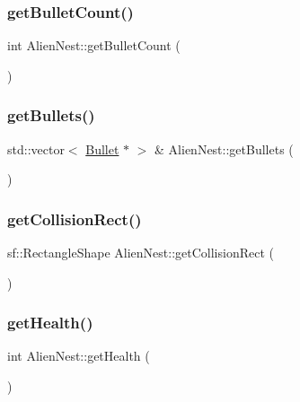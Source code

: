 \mbox{\label{class_alien_nest_a076132ab9da2dae0b0a4eb66b7dc41b8}} 
\subsubsection{\texorpdfstring{get\+Bullet\+Count()}{getBulletCount()}}
{\footnotesize\ttfamily int Alien\+Nest\+::get\+Bullet\+Count (\begin{DoxyParamCaption}{ }\end{DoxyParamCaption})}

\mbox{\label{class_alien_nest_a06b510eab5f7bb869078662f42080738}} 
\subsubsection{\texorpdfstring{get\+Bullets()}{getBullets()}}
{\footnotesize\ttfamily std\+::vector$<$ \hyperlink{class_bullet}{Bullet} $\ast$ $>$ \& Alien\+Nest\+::get\+Bullets (\begin{DoxyParamCaption}{ }\end{DoxyParamCaption})}

\mbox{\label{class_alien_nest_a7522ad4ae88e2471de29ab62451ec36a}} 
\subsubsection{\texorpdfstring{get\+Collision\+Rect()}{getCollisionRect()}}
{\footnotesize\ttfamily sf\+::\+Rectangle\+Shape Alien\+Nest\+::get\+Collision\+Rect (\begin{DoxyParamCaption}{ }\end{DoxyParamCaption})}

\mbox{\label{class_alien_nest_adca5cfd4eae3e3f72dd76960a29588e9}} 
\subsubsection{\texorpdfstring{get\+Health()}{getHealth()}}
{\footnotesize\ttfamily int Alien\+Nest\+::get\+Health (\begin{DoxyParamCaption}{ }\end{DoxyParamCaption})}

